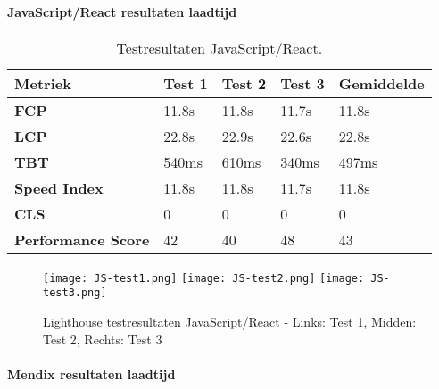 \paragraph{JavaScript/React resultaten laadtijd}

\begin{table}[h]
    \centering
    \begin{tabular}{ |p{3cm}|p{2.75cm}|p{2.75cm}|p{2.75cm}|p{2.75cm}|}
        \hline
        \textbf{Metriek} & \textbf{Test 1} & \textbf{Test 2}  & \textbf{Test 3} & \textbf{Gemiddelde}\\
        \hline
        \textbf{\gls{FCP}}  & 11.8s & 11.8s & 11.7s & 11.8s \\
        \hline
        \textbf{\gls{LCP}} & 22.8s & 22.9s & 22.6s & 22.8s\\
        \hline
        \textbf{\gls{TBT}}  & 540ms & 610ms & 340ms & 497ms \\
        \hline
        \textbf{Speed Index}  & 11.8s & 11.8s & 11.7s & 11.8s \\
        \hline
        \textbf{\gls{CLS}}  & 0 & 0  & 0 & 0 \\
        \hline
        \textbf{Performance Score}  & 42 & 40  & 48 & 43 \\
        \hline
    \end{tabular}
    \caption[\centering Testresultaten laadtijd JavaScript/React]{\label{tab:Testresultaten JavaScript/React}Testresultaten JavaScript/React.}
\end{table}

\begin{figure}[htbp]
    \centering
    \captionsetup{justification=centering}
    \texttt{[image: JS-test1.png]}
    \hfill
    \texttt{[image: JS-test2.png]}
    \hfill
    \texttt{[image: JS-test3.png]}
    \caption{Lighthouse testresultaten JavaScript/React - Links: Test 1, Midden: Test 2, Rechts: Test 3}
    \label{fig:javascript-simple}
\end{figure}

\newpage
\paragraph{Mendix resultaten laadtijd}

